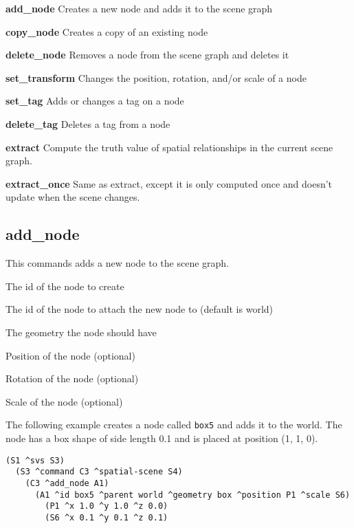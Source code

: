 \begin{description}
  \item{\textbf{add\_node}}
  Creates a new node and adds it to the scene graph
\item{\textbf{copy\_node}}
  Creates a copy of an existing node
\item{\textbf{delete\_node}}
  Removes a node from the scene graph and deletes it
\item{\textbf{set\_transform}}
  Changes the position, rotation, and/or scale of a node
\item{\textbf{set\_tag}}
  Adds or changes a tag on a node
\item{\textbf{delete\_tag}}
  Deletes a tag from a node
\item{\textbf{extract}}
	Compute the truth value of spatial relationships in the current scene graph.
\item{\textbf{extract\_once}}
  Same as extract, except it is only computed once and doesn't update when the scene changes.
\end{description}

\subsection{add\_node}

This commands adds a new node to the scene graph. 
\begin{description}
  \item{} The id of the node to create
  \item{} The id of the node to attach the new node to (default is world)
  \item{} The geometry the node should have 
  \item{} Position of the node (optional)
  \item{} Rotation of the node (optional)
  \item{} Scale of the node (optional)
\end{description}

The following example creates a node called \texttt{box5} and adds it to the world. 
The node has a box shape of side length 0.1 and is placed at position (1, 1, 0). 
\begin{verbatim}
(S1 ^svs S3)
  (S3 ^command C3 ^spatial-scene S4)
    (C3 ^add_node A1)
      (A1 ^id box5 ^parent world ^geometry box ^position P1 ^scale S6)
        (P1 ^x 1.0 ^y 1.0 ^z 0.0)
        (S6 ^x 0.1 ^y 0.1 ^z 0.1)
\end{verbatim}

